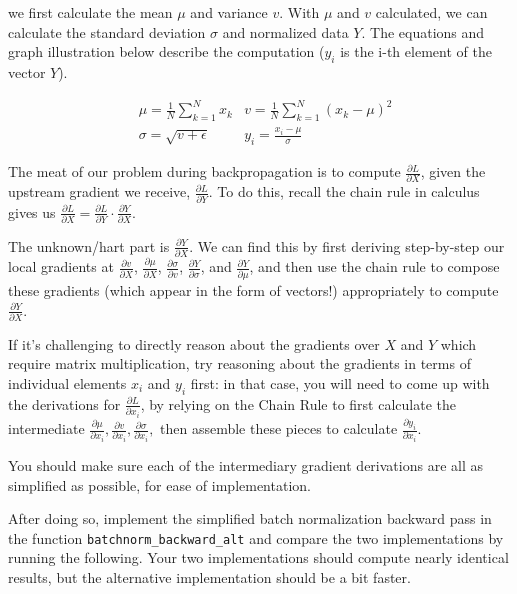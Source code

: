 \documentclass[11pt]{article}
\begin{document}
we first calculate the mean \(\mu\) and variance \(v\). With \(\mu\) and
\(v\) calculated, we can calculate the standard deviation \(\sigma\) and
normalized data \(Y\). The equations and graph illustration below
describe the computation (\(y_i\) is the i-th element of the vector
\(Y\)).

\begin{align}
& \mu=\frac{1}{N}\sum_{k=1}^N x_k  &  v=\frac{1}{N}\sum_{k=1}^N (x_k-\mu)^2 \\
& \sigma=\sqrt{v+\epsilon}         &  y_i=\frac{x_i-\mu}{\sigma}
\end{align}

    

    The meat of our problem during backpropagation is to compute
\(\frac{\partial L}{\partial X}\), given the upstream gradient we
receive, \(\frac{\partial L}{\partial Y}.\) To do this, recall the chain
rule in calculus gives us
\(\frac{\partial L}{\partial X} = \frac{\partial L}{\partial Y} \cdot \frac{\partial Y}{\partial X}\).

The unknown/hart part is \(\frac{\partial Y}{\partial X}\). We can find
this by first deriving step-by-step our local gradients at
\(\frac{\partial v}{\partial X}\), \(\frac{\partial \mu}{\partial X}\),
\(\frac{\partial \sigma}{\partial v}\),
\(\frac{\partial Y}{\partial \sigma}\), and
\(\frac{\partial Y}{\partial \mu}\), and then use the chain rule to
compose these gradients (which appear in the form of vectors!)
appropriately to compute \(\frac{\partial Y}{\partial X}\).

If it's challenging to directly reason about the gradients over \(X\)
and \(Y\) which require matrix multiplication, try reasoning about the
gradients in terms of individual elements \(x_i\) and \(y_i\) first: in
that case, you will need to come up with the derivations for
\(\frac{\partial L}{\partial x_i}\), by relying on the Chain Rule to
first calculate the intermediate
\(\frac{\partial \mu}{\partial x_i}, \frac{\partial v}{\partial x_i}, \frac{\partial \sigma}{\partial x_i},\)
then assemble these pieces to calculate
\(\frac{\partial y_i}{\partial x_i}\).

You should make sure each of the intermediary gradient derivations are
all as simplified as possible, for ease of implementation.

After doing so, implement the simplified batch normalization backward
pass in the function \texttt{batchnorm\_backward\_alt} and compare the
two implementations by running the following. Your two implementations
should compute nearly identical results, but the alternative
implementation should be a bit faster.
\end{document}
